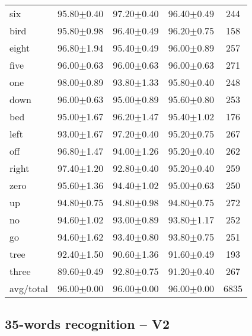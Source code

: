 \documentclass{beamer}
\begin{document}
{\begin{table}[h!]
\begin{tabular}{lcccc}
		six       &  95.80$\pm$0.40 &  97.20$\pm$0.40 &  96.40$\pm$0.49 &     244 \\
		bird      &  95.80$\pm$0.98 &  96.40$\pm$0.49 &  96.20$\pm$0.75 &     158 \\
		eight     &  96.80$\pm$1.94 &  95.40$\pm$0.49 &  96.00$\pm$0.89 &     257 \\
		five      &  96.00$\pm$0.63 &  96.00$\pm$0.63 &  96.00$\pm$0.63 &     271 \\
		one       &  98.00$\pm$0.89 &  93.80$\pm$1.33 &  95.80$\pm$0.40 &     248 \\
		down      &  96.00$\pm$0.63 &  95.00$\pm$0.89 &  95.60$\pm$0.80 &     253 \\
		bed       &  95.00$\pm$1.67 &  96.20$\pm$1.47 &  95.40$\pm$1.02 &     176 \\
		left      &  93.00$\pm$1.67 &  97.20$\pm$0.40 &  95.20$\pm$0.75 &     267 \\
		off       &  96.80$\pm$1.47 &  94.00$\pm$1.26 &  95.20$\pm$0.40 &     262 \\
		right     &  97.40$\pm$1.20 &  92.80$\pm$0.40 &  95.20$\pm$0.40 &     259 \\
		zero      &  95.60$\pm$1.36 &  94.40$\pm$1.02 &  95.00$\pm$0.63 &     250 \\
		up        &  94.80$\pm$0.75 &  94.80$\pm$0.98 &  94.80$\pm$0.75 &     272 \\
		no        &  94.60$\pm$1.02 &  93.00$\pm$0.89 &  93.80$\pm$1.17 &     252 \\
		go        &  94.60$\pm$1.62 &  93.40$\pm$0.80 &  93.80$\pm$0.75 &     251 \\
		tree      &  92.40$\pm$1.50 &  90.60$\pm$1.36 &  91.60$\pm$0.49 &     193 \\
		three     &  89.60$\pm$0.49 &  92.80$\pm$0.75 &  91.20$\pm$0.40 &     267 \\
		\midrule avg/total &  96.00$\pm$0.00 &  96.00$\pm$0.00 &  96.00$\pm$0.00 &    6835 \\
		\bottomrule
	\end{tabular}

\end{table}
}

\subsection{35-words recognition – V2}
\end{document}
